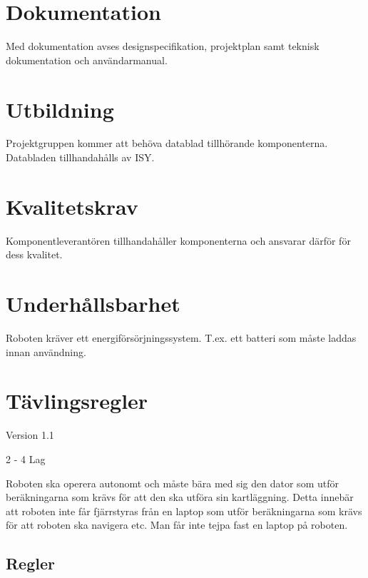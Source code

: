 \documentclass[a4paper,12pt]{article}
\begin{document}
\section{Dokumentation}

\begin{LIPSkravlista}
\end{LIPSkravlista}

Med dokumentation avses designspecifikation, projektplan
samt teknisk dokumentation och användarmanual.

\section{Utbildning}
Projektgruppen kommer att behöva datablad tillhörande komponenterna. Databladen
tillhandahålls av ISY.

\section{Kvalitetskrav}
Komponentleverantören tillhandahåller komponenterna och ansvarar därför för
dess kvalitet.

\section{Underhållsbarhet}
Roboten kräver ett energiförsörjningssystem. T.ex. ett batteri som måste laddas
innan användning.

\newpage
\appendix
\section{Tävlingsregler} \label{app:rules}
Version 1.1

2 - 4 Lag

Roboten ska operera autonomt och måste bära med sig den dator som utför
beräkningarna som krävs för att den ska utföra sin kartläggning.  Detta innebär
att roboten inte får fjärrstyras från en laptop som utför beräkningarna som
krävs för att roboten ska navigera etc.  Man får inte tejpa fast en laptop på
roboten.

\subsection{Regler}
\end{document}

